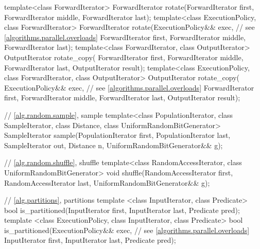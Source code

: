 \begin{codeblock}
{  template<class ForwardIterator>
    ForwardIterator rotate(ForwardIterator first,
                           ForwardIterator middle,
                           ForwardIterator last);
  template<class ExecutionPolicy, class ForwardIterator>
    ForwardIterator rotate(ExecutionPolicy&& exec, // see \ref{algorithms.parallel.overloads}
                           ForwardIterator first,
                           ForwardIterator middle,
                           ForwardIterator last);
  template<class ForwardIterator, class OutputIterator>
    OutputIterator rotate_copy(
      ForwardIterator first, ForwardIterator middle,
      ForwardIterator last, OutputIterator result);
  template<class ExecutionPolicy, class ForwardIterator, class OutputIterator>
    OutputIterator rotate_copy(
      ExecutionPolicy&& exec, // see \ref{algorithms.parallel.overloads}
      ForwardIterator first, ForwardIterator middle,
      ForwardIterator last, OutputIterator result);

  // \ref{alg.random.sample}, sample
  template<class PopulationIterator, class SampleIterator,
           class Distance, class UniformRandomBitGenerator>
    SampleIterator sample(PopulationIterator first, PopulationIterator last,
                          SampleIterator out, Distance n,
                          UniformRandomBitGenerator&& g);

  // \ref{alg.random.shuffle}, shuffle
  template<class RandomAccessIterator, class UniformRandomBitGenerator>
    void shuffle(RandomAccessIterator first,
                 RandomAccessIterator last,
                 UniformRandomBitGenerator&& g);

  // \ref{alg.partitions}, partitions
  template <class InputIterator, class Predicate>
    bool is_partitioned(InputIterator first, InputIterator last, Predicate pred);
  template <class ExecutionPolicy, class InputIterator, class Predicate>
    bool is_partitioned(ExecutionPolicy&& exec, // see \ref{algorithms.parallel.overloads}
                        InputIterator first, InputIterator last, Predicate pred);

}
\end{codeblock}
